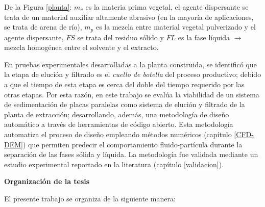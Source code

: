 \noindent
\justify

De la Figura \ref{planta}: $m_v$ es la materia prima vegetal, el agente dispersante se trata de un material auxiliar altamente abrasivo (en la mayor\'ia de aplicaciones, se trata de arena de r\'io), $m_p$ es la mezcla entre material vegetal pulverizado y el agente dispersante, $FS$ se trata del residuo s\'olido y $FL$ es la fase l\'iquida $\rightarrow$ mezcla homog\'enea entre el solvente y el extracto.

\noindent
\justify

En pruebas experimentales desarrolladas a la planta construida, se identific\'o que la etapa de eluci\'on y filtrado es el \textit{cuello de botella} del proceso productivo; debido a que el tiempo de esta etapa es cerca del doble del tiempo requerido por las otras etapas. Por esta raz\'on, en este trabajo se eval\'ua la viabilidad de un sistema de sedimentaci\'on de placas paralelas como sistema de eluci\'on y filtrado de la planta de extracci\'on; desarrollando, adem\'as, una metodolog\'ia de dise\~no autom\'atico a trav\'es de herramientas de c\'odigo abierto. Esta metodolog\'ia automatiza el proceso de dise\~no empleando m\'etodos num\'ericos (cap\'itulo \ref{CFD-DEM}) que permiten predecir el comportamiento fluido-part\'icula durante la separaci\'on de las fases s\'olida y l\'iquida. La metodolog\'ia fue validada mediante un estudio experimental reportado en la literatura (cap\'itulo \ref{validacion}). 


\newpage

\noindent
\justify

\textbf{\Large Organizaci\'on de la tesis}

\noindent
\justify

El presente trabajo se organiza de la siguiente manera:

